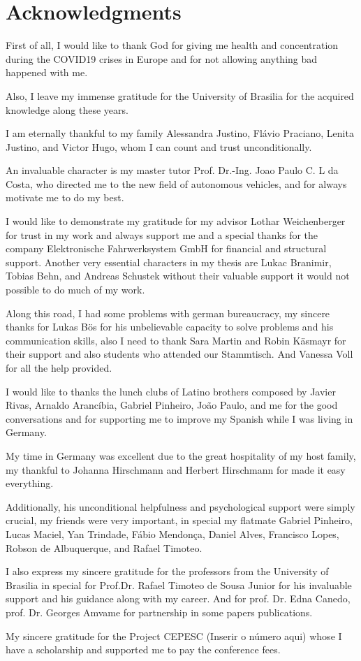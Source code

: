 \chapter*{Acknowledgments}

First of all, I would like to thank God for giving me health and concentration during the COVID19 crises in Europe and for not allowing anything bad happened with me.

Also, I leave my immense gratitude for the University of Brasilia for the acquired knowledge along these years.


I am eternally thankful to my family Alessandra Justino, Flávio Praciano, Lenita Justino, and Victor Hugo, whom I can count and trust unconditionally.

An invaluable character is my master tutor Prof. Dr.-Ing. Joao Paulo C. L da Costa, who directed me to the new field of autonomous vehicles, and for always motivate me to do my best.

I would like to demonstrate my gratitude for my advisor Lothar Weichenberger for trust in my work and always support me and a special thanks for the company Elektronische Fahrwerksystem GmbH for financial and structural support. Another very essential characters in my thesis are Lukac Branimir, Tobias Behn, and Andreas Schustek without their valuable support it would not possible to do much of my work.

Along this road, I had some problems with german bureaucracy, my sincere thanks for Lukas Bös for his unbelievable capacity to solve problems and his communication skills, also I need to thank Sara Martin and Robin Käsmayr for their support and also students who attended our Stammtisch. And Vanessa Voll for all the help provided.

I would like to thanks the lunch clubs of Latino brothers composed by Javier Rivas, Arnaldo Arancíbia, Gabriel Pinheiro, João Paulo, and me for the good conversations and for supporting me to improve my Spanish while I was living in Germany.

My time in Germany was excellent due to the great hospitality of my host family, my thankful to Johanna Hirschmann and Herbert Hirschmann for made it easy everything. 

Additionally, his unconditional helpfulness and psychological support were simply
crucial, my friends were very important, in special my flatmate Gabriel Pinheiro, Lucas Maciel, Yan Trindade, Fábio Mendonça, Daniel Alves, Francisco Lopes, Robson de Albuquerque, and Rafael Timoteo. 

I also express my sincere gratitude for the professors from the University of Brasilia in special for Prof.Dr. Rafael Timoteo de Sousa Junior for his invaluable support and his guidance along with my career. And for prof. Dr. Edna Canedo, prof. Dr. Georges Amvame for partnership in some papers publications.

My sincere gratitude for the Project CEPESC (Inserir o número aqui) whose I have a scholarship and supported me to pay the conference fees.